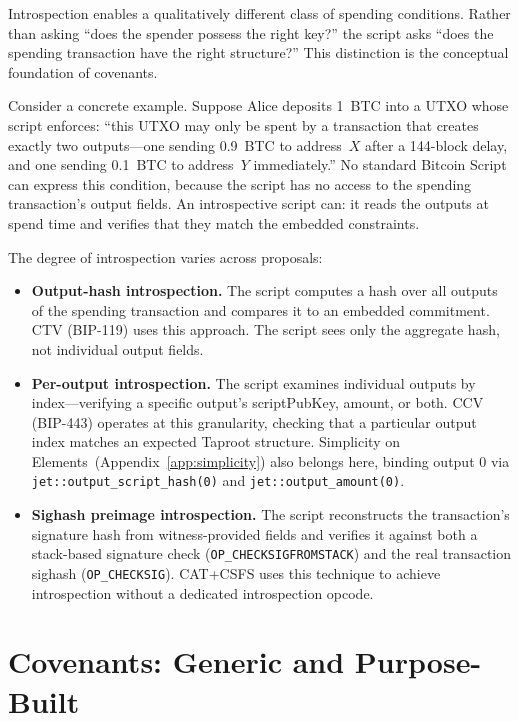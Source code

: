 Introspection enables a qualitatively different class of spending conditions. Rather
than asking ``does the spender possess the right key?'' the script asks ``does the
spending transaction have the right structure?'' This distinction is the conceptual
foundation of covenants.

Consider a concrete example. Suppose Alice deposits 1~BTC into a UTXO whose script
enforces: ``this UTXO may only be spent by a transaction that creates exactly two
outputs---one sending 0.9~BTC to address~$X$ after a 144-block delay, and one
sending 0.1~BTC to address~$Y$ immediately.'' No standard Bitcoin Script can express
this condition, because the script has no access to the spending transaction's output
fields. An introspective script can: it reads the outputs at spend time and verifies
that they match the embedded constraints.

The degree of introspection varies across proposals:

\begin{itemize}
\item \textbf{Output-hash introspection.} The script computes a hash over all outputs
  of the spending transaction and compares it to an embedded commitment. CTV (BIP-119)
  uses this approach. The script sees only the aggregate hash, not individual output
  fields.

\item \textbf{Per-output introspection.} The script examines individual outputs by
  index---verifying a specific output's scriptPubKey, amount, or both. CCV (BIP-443)
  operates at this granularity, checking that a particular output index matches an
  expected Taproot structure. Simplicity on Elements~(Appendix~\ref{app:simplicity})
  also belongs here, binding output 0 via
  \texttt{jet::output\_script\_hash(0)} and \texttt{jet::output\_amount(0)}.

\item \textbf{Sighash preimage introspection.} The script reconstructs the transaction's
  signature hash from witness-provided fields and verifies it against both a stack-based
  signature check (\texttt{OP\_CHECKSIGFROMSTACK}) and the real transaction sighash
  (\texttt{OP\_CHECKSIG}). CAT+CSFS uses this technique to achieve introspection without
  a dedicated introspection opcode.
\end{itemize}

\section{Covenants: Generic and Purpose-Built} \label{se:covenant_taxonomy}

